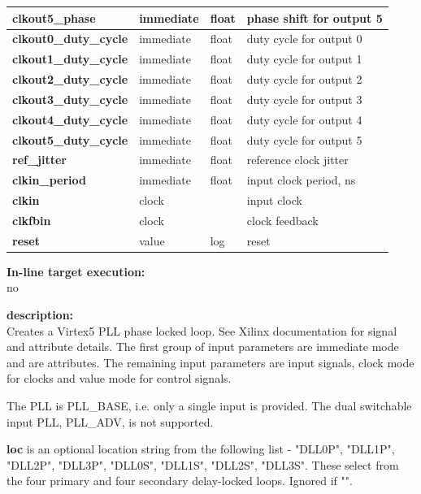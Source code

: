 \begin{tabular}{| l | l | l | l |}
            {\bf clkout5\_phase}       & immediate & float & phase shift for output 5 \\ \hline
            {\bf clkout0\_duty\_cycle} & immediate & float & duty cycle for output 0 \\ \hline
            {\bf clkout1\_duty\_cycle} & immediate & float & duty cycle for output 1 \\ \hline
            {\bf clkout2\_duty\_cycle} & immediate & float & duty cycle for output 2 \\ \hline
            {\bf clkout3\_duty\_cycle} & immediate & float & duty cycle for output 3 \\ \hline
            {\bf clkout4\_duty\_cycle} & immediate & float & duty cycle for output 4 \\ \hline
            {\bf clkout5\_duty\_cycle} & immediate & float & duty cycle for output 5 \\ \hline
            {\bf ref\_jitter}          & immediate & float & reference clock jitter \\ \hline
            {\bf clkin\_period}        & immediate & float & input clock period, ns\\ \hline
            {\bf clkin}                & clock     &       & input clock \\ \hline
            {\bf clkfbin}              & clock     &       & clock feedback \\ \hline
            {\bf reset}                & value     & log   & reset \\ \hline
            \end{tabular}

            {\bf In-line target execution:} \\
            no

            {\bf description:} \\
            Creates a Virtex5 PLL phase locked loop. See Xilinx documentation for
            signal and attribute details. The first group of input parameters are
            immediate mode and are attributes. The remaining input parameters are
            input signals, clock mode for clocks and value mode for control signals.

            The PLL is PLL\_BASE, i.e. only a single input is provided.
            The dual switchable input PLL, PLL\_ADV, is not supported.


                {\bf loc} is an optional location string from the
                following list - "DLL0P", "DLL1P", "DLL2P", "DLL3P", "DLL0S", "DLL1S",
                "DLL2S", "DLL3S". These select from the four primary and four secondary
                delay-locked loops. Ignored if "".

